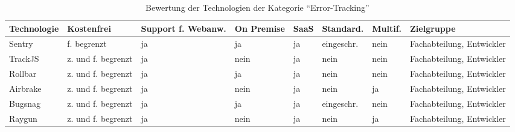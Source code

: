 \begin{table}[H]%
\centering
\addtolength{\leftskip}{-2cm}
\addtolength{\rightskip}{-2cm}
\begin{tabular}{|p{3.05cm}|p{1.8cm}|p{1.7cm}|p{1.2cm}|p{1.3cm}|p{1.7cm}|p{1.3cm}|p{2.6cm}|}
\hline
Technologie & Kostenfrei & Support f. Webanw. & On \mbox{Premise} & SaaS & Standard. & Multif. & Zielgruppe \\
\hline
Sentry & f. begrenzt & ja & ja & ja & eingeschr. & nein & Fachabteilung, Entwickler \\
\hline
TrackJS & z. und f. begrenzt & ja & nein & ja & nein & nein & Fachabteilung, Entwickler \\
\hline
Rollbar & z. und f. begrenzt & ja & ja & ja & nein & nein & Fachabteilung, Entwickler \\
\hline
Airbrake & z. und f. begrenzt & ja & nein & ja & nein & ja & Fachabteilung, Entwickler \\
\hline
Bugsnag & z. und f. begrenzt & ja & ja & ja & eingeschr. & nein & Fachabteilung, Entwickler \\
\hline
Raygun & z. und f. begrenzt & ja & nein & ja & nein & ja & Fachabteilung, Entwickler \\
\hline
\end{tabular}
\caption{Bewertung der Technologien der Kategorie \enquote{Error-Tracking}}
\label{tab:technologie-bewertung-error-tracking}
\end{table}
